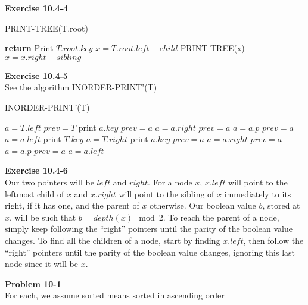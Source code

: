 \documentclass{article}
\begin{document}
\noindent\textbf{Exercise 10.4-4}\\

\begin{algorithm}
\caption{PRINT-TREE(T.root)}
\begin{algorithmic}
	\State \textbf{return}
\Else
	\State Print $T.root.key$
	\State $x = T.root.left-child$
		\State PRINT-TREE(x)
		\State $x = x.right-sibling$
	\EndWhile
\EndIf
\end{algorithmic}
\end{algorithm}

\noindent\textbf{ Exercise 10.4-5} \\
See the algorithm INORDER-PRINT'(T)
\begin{algorithm}
\caption{INORDER-PRINT'(T)}
\begin{algorithmic}
\State $a = T.left$
\State $prev = T$
\State print $a.key$
\State $prev = a$
\State $a = a.right$
\State $prev = a$
\State $a = a.p$
\State $prev = a$
\State $a = a.left$
\EndIf
\EndWhile
\State print $T.key$
\State $a = T.right$
\State print $a.key$
\State $prev = a$
\State $a = a.right$
\State $prev = a$
\State $a = a.p$
\State $prev = a$
\State $a = a.left$
\EndIf
\EndWhile
\end{algorithmic}
\end{algorithm}

\noindent\textbf{Exercise 10.4-6}\\

Our two pointers will be $left$ and $right$.  For a node $x$, $x.left$ will point to the leftmost child of $x$ and $x.right$ will point to the sibling of $x$ immediately to its right, if it has one, and the parent of $x$ otherwise.  Our boolean value $b$, stored at $x$, will be such that $b = depth(x) \mod 2$.  To reach the parent of a node, simply keep following the ``right'' pointers until the parity of the boolean value changes.  To find all the children of a node, start by finding $x.left$, then follow the ``right'' pointers until the parity of the boolean value changes, ignoring this last node since it will be $x$.

\noindent\textbf{ Problem 10-1} \\

For each, we assume sorted means sorted in ascending order
\end{document}
